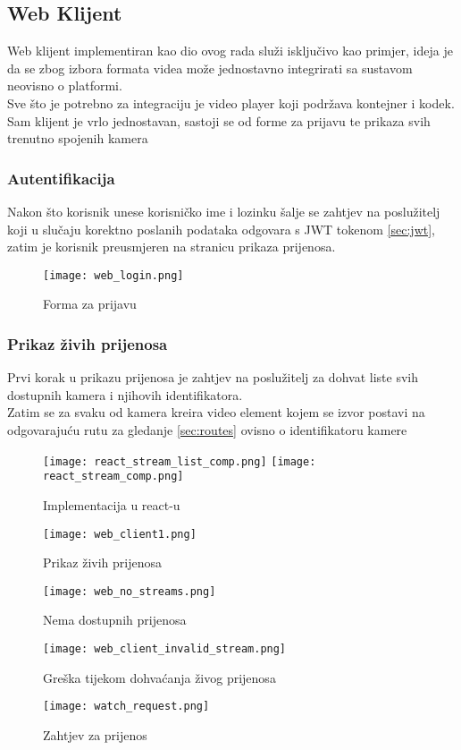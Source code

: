 \subsection{Web Klijent}
Web klijent implementiran kao dio ovog rada služi isključivo kao primjer, ideja je da se zbog izbora formata videa 
može jednostavno integrirati sa sustavom neovisno o platformi. \\
Sve što je potrebno za integraciju je video player koji podržava  kontejner i  kodek.
\paraBreak
Sam klijent je vrlo jednostavan, sastoji se od forme za prijavu te prikaza svih trenutno spojenih kamera

\subsubsection{Autentifikacija}
Nakon što korisnik unese korisničko ime i lozinku šalje se zahtjev na poslužitelj koji u slučaju korektno poslanih
podataka odgovara s JWT tokenom \ref{sec:jwt}, zatim je korisnik preusmjeren na stranicu prikaza prijenosa.

\begin{figure} [h]
  \texttt{[image: web\_login.png]}
  \caption{Forma za prijavu}
\end{figure}

\subsubsection{Prikaz živih prijenosa}
Prvi korak u prikazu prijenosa je zahtjev na poslužitelj za dohvat liste svih dostupnih kamera i njihovih identifikatora. \\
Zatim se za svaku od kamera kreira video element kojem se izvor postavi na odgovarajuću rutu za 
gledanje \ref{sec:routes} ovisno o identifikatoru kamere

\begin{figure}
  \texttt{[image: react\_stream\_list\_comp.png]}
  \texttt{[image: react\_stream\_comp.png]}
  \caption{Implementacija u react-u}
\end{figure}

\begin{figure} [h]
  \texttt{[image: web\_client1.png]}
  \caption{Prikaz živih prijenosa}
\end{figure}

\begin{figure} [h]
  \texttt{[image: web\_no\_streams.png]}
  \caption{Nema dostupnih prijenosa}
\end{figure}

\begin{figure} [h]
  \texttt{[image: web\_client\_invalid\_stream.png]}
  \caption{Greška tijekom dohvaćanja živog prijenosa}
\end{figure}

\begin{figure} [h]
  \texttt{[image: watch\_request.png]}
  \caption{Zahtjev za prijenos}
\end{figure}
